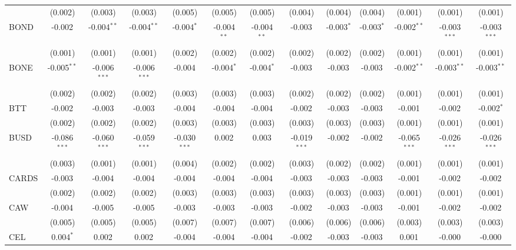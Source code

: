 \begin{table}[!htbp]
\begin{tabular}{@{\extracolsep{5pt}}lcccccccccccc}
  & (0.002) & (0.003) & (0.003) & (0.005) & (0.005) & (0.005) & (0.004) & (0.004) & (0.004) & (0.001) & (0.001) & (0.001) \\
 BOND & -0.002$^{}$ & -0.004$^{**}$ & -0.004$^{**}$ & -0.004$^{*}$ & -0.004$^{**}$ & -0.004$^{**}$ & -0.003$^{}$ & -0.003$^{*}$ & -0.003$^{*}$ & -0.002$^{**}$ & -0.003$^{***}$ & -0.003$^{***}$ \\
  & (0.001) & (0.001) & (0.001) & (0.002) & (0.002) & (0.002) & (0.002) & (0.002) & (0.002) & (0.001) & (0.001) & (0.001) \\
 BONE & -0.005$^{**}$ & -0.006$^{***}$ & -0.006$^{***}$ & -0.004$^{}$ & -0.004$^{*}$ & -0.004$^{*}$ & -0.003$^{}$ & -0.003$^{}$ & -0.003$^{}$ & -0.002$^{**}$ & -0.003$^{**}$ & -0.003$^{**}$ \\
  & (0.002) & (0.002) & (0.002) & (0.003) & (0.003) & (0.003) & (0.002) & (0.002) & (0.002) & (0.001) & (0.001) & (0.001) \\
 BTT & -0.002$^{}$ & -0.003$^{}$ & -0.003$^{}$ & -0.004$^{}$ & -0.004$^{}$ & -0.004$^{}$ & -0.002$^{}$ & -0.003$^{}$ & -0.003$^{}$ & -0.001$^{}$ & -0.002$^{}$ & -0.002$^{*}$ \\
  & (0.002) & (0.002) & (0.002) & (0.003) & (0.003) & (0.003) & (0.003) & (0.003) & (0.003) & (0.001) & (0.001) & (0.001) \\
 BUSD & -0.086$^{***}$ & -0.060$^{***}$ & -0.059$^{***}$ & -0.030$^{***}$ & 0.002$^{}$ & 0.003$^{}$ & -0.019$^{***}$ & -0.002$^{}$ & -0.002$^{}$ & -0.065$^{***}$ & -0.026$^{***}$ & -0.026$^{***}$ \\
  & (0.003) & (0.001) & (0.001) & (0.004) & (0.002) & (0.002) & (0.003) & (0.002) & (0.002) & (0.001) & (0.001) & (0.001) \\
 CARDS & -0.003$^{}$ & -0.004$^{}$ & -0.004$^{}$ & -0.004$^{}$ & -0.004$^{}$ & -0.004$^{}$ & -0.003$^{}$ & -0.003$^{}$ & -0.003$^{}$ & -0.001$^{}$ & -0.002$^{}$ & -0.002$^{}$ \\
  & (0.002) & (0.002) & (0.002) & (0.003) & (0.003) & (0.003) & (0.003) & (0.003) & (0.003) & (0.001) & (0.001) & (0.001) \\
 CAW & -0.004$^{}$ & -0.005$^{}$ & -0.005$^{}$ & -0.003$^{}$ & -0.003$^{}$ & -0.003$^{}$ & -0.002$^{}$ & -0.003$^{}$ & -0.003$^{}$ & -0.001$^{}$ & -0.002$^{}$ & -0.002$^{}$ \\
  & (0.005) & (0.005) & (0.005) & (0.007) & (0.007) & (0.007) & (0.006) & (0.006) & (0.006) & (0.003) & (0.003) & (0.003) \\
 CEL & 0.004$^{*}$ & 0.002$^{}$ & 0.002$^{}$ & -0.004$^{}$ & -0.004$^{}$ & -0.004$^{}$ & -0.002$^{}$ & -0.003$^{}$ & -0.003$^{}$ & 0.001$^{}$ & -0.000$^{}$ & -0.000$^{}$ \\

\end{tabular}
\end{table}
